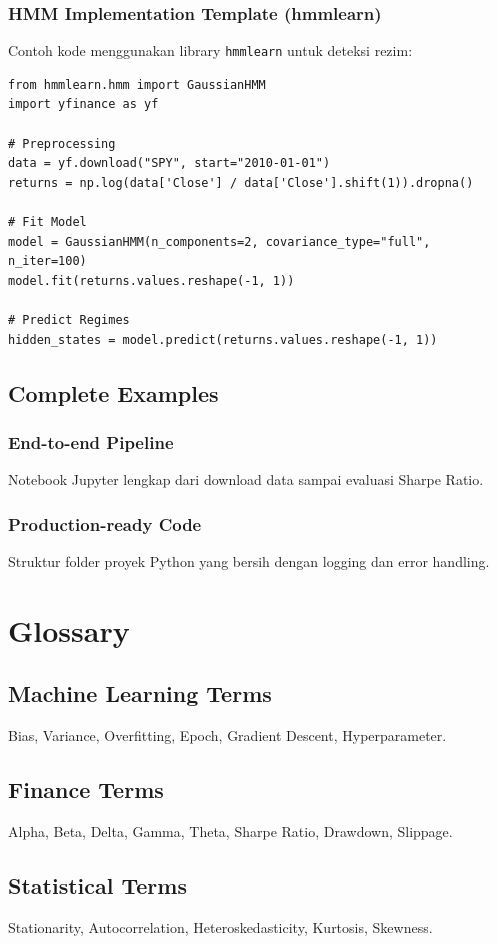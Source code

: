 \documentclass[12pt,a4paper]{book}
\begin{document}
\subsection{HMM Implementation Template (hmmlearn)}
Contoh kode menggunakan library \texttt{hmmlearn} untuk deteksi rezim:
\begin{verbatim}
from hmmlearn.hmm import GaussianHMM
import yfinance as yf

# Preprocessing
data = yf.download("SPY", start="2010-01-01")
returns = np.log(data['Close'] / data['Close'].shift(1)).dropna()

# Fit Model
model = GaussianHMM(n_components=2, covariance_type="full", n_iter=100)
model.fit(returns.values.reshape(-1, 1))

# Predict Regimes
hidden_states = model.predict(returns.values.reshape(-1, 1))
\end{verbatim}

\section{Complete Examples}
\subsection{End-to-end Pipeline}
Notebook Jupyter lengkap dari download data sampai evaluasi Sharpe Ratio.

\subsection{Production-ready Code}
Struktur folder proyek Python yang bersih dengan logging dan error handling.

\chapter{Glossary}
\section{Machine Learning Terms}
Bias, Variance, Overfitting, Epoch, Gradient Descent, Hyperparameter.

\section{Finance Terms}
Alpha, Beta, Delta, Gamma, Theta, Sharpe Ratio, Drawdown, Slippage.

\section{Statistical Terms}
Stationarity, Autocorrelation, Heteroskedasticity, Kurtosis, Skewness.
\end{document}
